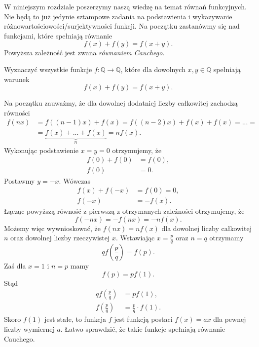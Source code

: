 

\noindent
W niniejszym rozdziale poszerzymy naszą wiedzę na temat równań funkcyjnych. Nie będą to już jedynie sztampowe zadania na podstawienia i wykazywanie różnowartościowości/surjektywności funkcji. Na początku zastanówmy się nad funkcjami, które spełniają równanie
\[
	f(x) + f(y) = f(x + y).
\]
Powyższa zależność jest zwana \textit{równaniem Cauchego}.

\vspace{10px}


\noindent
Wyznaczyć wszystkie funkcje $f:\mathbb{Q}\longrightarrow\mathbb{Q}$, które dla dowolnych $x, y \in \mathbb{Q}$ spełniają warunek
\[
	f(x) + f(y) = f(x + y).
\]


\noindent
Na początku zauważmy, że dla dowolnej dodatniej liczby całkowitej zachodzą równości
\begin{align*}
	f(nx) &= f((n - 1)x) + f(x) = f((n - 2)x) + f(x) + f(x) = ... = \\
	&=  \underbrace{f(x) + ... + f(x)}_{n} = nf(x).
\end{align*}
Wykonując podstawienie $x = y = 0$ otrzymujemy, że
\begin{align*}
	f(0) + f(0) &= f(0), \\
	f(0) &= 0.
\end{align*}
Postawmy $y = -x$. Wówczas
\begin{align*}
	f(x) + f(-x) &= f(0) = 0, \\
	f(-x) &= -f(x).
\end{align*}
Łącząc powyższą równość z pierwszą z otrzymanych zależności otrzymujemy, że
\[
	f(-nx) = -f(nx) = -nf(x).
\]
Możemy więc wywnioskować, że $f(nx) 
= nf(x)$ dla dowolnej liczby całkowitej $n$ oraz dowolnej liczby rzeczywistej $x$. Wstawiając $x = \frac{p}{q}$ oraz $n = q$ otrzymamy
\[
	qf\left(\frac{p}{q}\right) = f(p).
\]
Zaś dla $x = 1$ i $n = p$ mamy
\[
	f(p) = pf(1).
\]
Stąd
\begin{align*}
	qf\left(\frac{p}{q}\right) &= pf(1), \\
	f\left(\frac{p}{q}\right) &= \frac{p}{q} \cdot f(1).
\end{align*}
Skoro $f(1)$ jest stałe, to funkcja $f$ jest funkcją postaci $f(x) = ax$ dla pewnej liczby wymiernej $a$. Łatwo sprawdzić, że takie funkcje spełniają równanie Cauchego.

